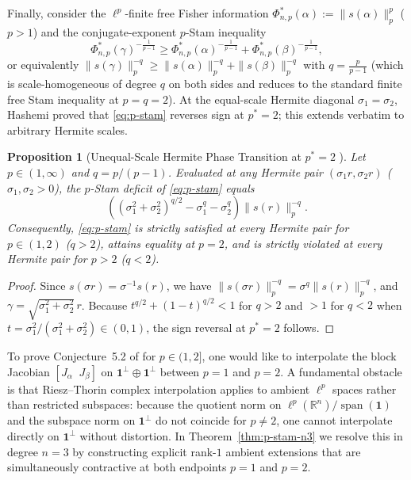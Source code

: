 \documentclass[11pt,a4paper]{article}
\newtheorem{proposition}[theorem]{Proposition}
\theoremstyle{definition}
\DeclareMathOperator{\Span}{span}
\newcommand{\R}{\mathbb{R}}
\newcommand{\one}{\mathbf{1}}
\begin{document}
Finally, consider the $\ell^p$-finite free Fisher information $\Phi_{n,p}^*(\alpha) := \|s(\alpha)\|_p^p$ ($p > 1$) and the conjugate-exponent $p$-Stam inequality
\begin{equation}
\label{eq:p-stam}
\Phi_{n,p}^*(\gamma)^{-\frac{1}{p-1}} \ge \Phi_{n,p}^*(\alpha)^{-\frac{1}{p-1}} + \Phi_{n,p}^*(\beta)^{-\frac{1}{p-1}},
\end{equation}
or equivalently $\|s(\gamma)\|_p^{-q} \ge \|s(\alpha)\|_p^{-q} + \|s(\beta)\|_p^{-q}$ with $q = \frac{p}{p-1}$ (which is scale-homogeneous of degree $q$ on both sides and reduces to the standard finite free Stam inequality at $p = q = 2$). At the equal-scale Hermite diagonal $\sigma_1 = \sigma_2$, Hashemi \cite[Proposition~5.5 and Lemma~5.6]{Hashemi2026} proved that \eqref{eq:p-stam} reverses sign at $p^* = 2$; this extends verbatim to arbitrary Hermite scales.

\begin{proposition}[Unequal-Scale Hermite Phase Transition at $p^* = 2$ {\cite[cf.~Proposition~5.5]{Hashemi2026}}]
\label{prop:p-stam}
Let $p \in (1, \infty)$ and $q = p/(p-1)$. Evaluated at any Hermite pair $(\sigma_1 r, \sigma_2 r)$ ($\sigma_1, \sigma_2 > 0$), the $p$-Stam deficit of \eqref{eq:p-stam} equals
\[
\left( (\sigma_1^2 + \sigma_2^2)^{q/2} - \sigma_1^q - \sigma_2^q \right) \|s(r)\|_p^{-q}.
\]
Consequently, \eqref{eq:p-stam} is strictly satisfied at every Hermite pair for $p \in (1, 2)$ ($q > 2$), attains equality at $p = 2$, and is strictly violated at every Hermite pair for $p > 2$ ($q < 2$).
\end{proposition}

\begin{proof}
Since $s(\sigma r) = \sigma^{-1} s(r)$, we have $\|s(\sigma r)\|_p^{-q} = \sigma^q \|s(r)\|_p^{-q}$, and $\gamma = \sqrt{\sigma_1^2 + \sigma_2^2}\,r$. Because $t^{q/2} + (1-t)^{q/2} < 1$ for $q > 2$ and $> 1$ for $q < 2$ when $t = \sigma_1^2/(\sigma_1^2+\sigma_2^2) \in (0,1)$, the sign reversal at $p^* = 2$ follows.
\end{proof}

To prove Conjecture~5.2 of \cite{Hashemi2026} for $p \in (1, 2]$, one would like to interpolate the block Jacobian $[J_\alpha\;\; J_\beta]$ on $\one^\perp \oplus \one^\perp$ between $p = 1$ and $p = 2$. A fundamental obstacle is that Riesz--Thorin complex interpolation applies to ambient $\ell^p$ spaces rather than restricted subspaces: because the quotient norm on $\ell^p(\R^n)/\Span(\one)$ and the subspace norm on $\one^\perp$ do not coincide for $p \neq 2$, one cannot interpolate directly on $\one^\perp$ without distortion. In Theorem~\ref{thm:p-stam-n3} we resolve this in degree $n = 3$ by constructing explicit rank-$1$ ambient extensions that are simultaneously contractive at both endpoints $p = 1$ and $p = 2$.
\end{document}
